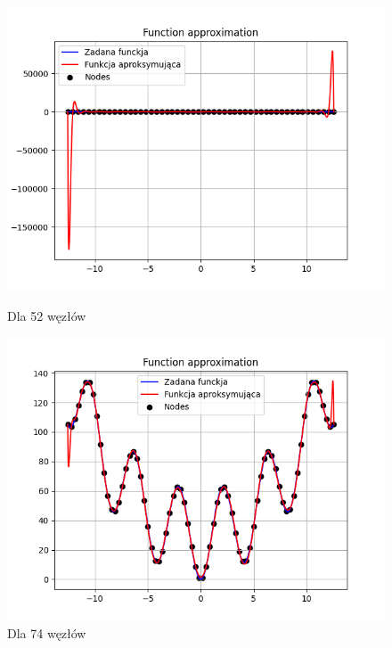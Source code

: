 \documentclass{article}
\begin{document}
\begin{figure}[H]
  \begin{minipage}[b]{0.49\textwidth}
    \begin{minipage}[b]{\textwidth}
      \includegraphics[width=\textwidth]{img43.png}
      \caption{Dla 52 węzłów}
    \end{minipage}
    \vspace*{\fill}
    \begin{minipage}[b]{\textwidth}
      \includegraphics[width=\textwidth]{img44.png}
      \caption{Dla 74 węzłów}
    \end{minipage}
  \end{minipage}
  \hfill
  \begin{minipage}[b]{0.49\textwidth}

\end{minipage}
\end{figure}
\end{document}
